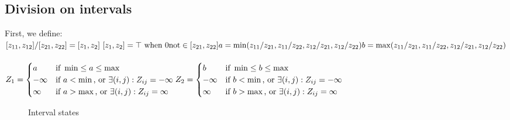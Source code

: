 \subsection{Division on intervals}
First, we define:\\
$
[z_{11}, z_{12}] / [z_{21}, z_{22}] = [z_{1}, z_{2}]\
[z_{1}, z_{2}] = \top \text{ when } 0 \text{not} \in [z_{21}, z_{22}]\\
a = \min(z_{11} / z_{21}, z_{11} / z_{22}, z_{12} / z_{21}, z_{12} / z_{22})\\
b = \max(z_{11} / z_{21}, z_{11} / z_{22}, z_{12} / z_{21}, z_{12} / z_{22})\\
$\\\\
$Z_1 =
     \begin{cases} 
        a       & \text{if } \min \leq a \leq \max \\
        -\infty & \text{if } a < \min \text{, or } \exists (i,j) : {Z_{ij} = -\infty} \\
        \infty & \text{if } a > \max \text{, or } \exists (i,j) : {Z_{ij} = \infty} \\
     \end{cases}\\
Z_2 =
     \begin{cases} 
        b       & \text{if } \min \leq b \leq \max \\
        -\infty & \text{if } b < \min \text{, or } \exists (i,j) : {Z_{ij} = -\infty} \\
        \infty & \text{if } b > \max \text{, or } \exists (i,j) : {Z_{ij} = \infty} \\
     \end{cases}
$

\begin{figure}
\centering
\caption{Interval states}
\label{figure:interval_states}
\end{figure}


